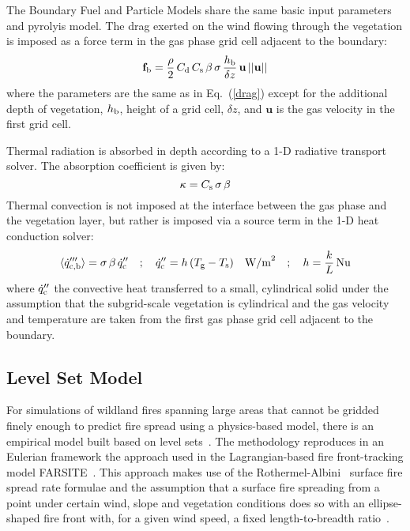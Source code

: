 \documentclass[journal,article,atmosphere,submit,moreauthors,pdftex]{Definitions/mdpi}
\begin{document}
The Boundary Fuel and Particle Models share the same basic input parameters and pyrolyis model. The drag exerted on the wind flowing through the vegetation is imposed as a force term in the gas phase grid cell adjacent to the boundary:
\begin{equation}
    \mathbf{f}_{\rm b} = \frac{\rho}{2} \, C_{\rm d} \, C_{\rm s} \, \beta \, \sigma \, \frac{h_{\rm b}}{\delta z} \, \mathbf{u} \, ||\mathbf{u}||
\end{equation}
where the parameters are the same as in Eq.~(\ref{drag}) except for the additional depth of vegetation, $h_{\rm b}$, height of a grid cell, $\delta z$, and $\mathbf{u}$ is the gas velocity in the first grid cell.

Thermal radiation is absorbed in depth according to a 1-D radiative transport solver. The absorption coefficient is given by:
\begin{equation}
   \kappa = C_{\rm s} \, \sigma \, \beta
\end{equation}
Thermal convection is not imposed at the interface between the gas phase and the vegetation layer, but rather is imposed via a source term in the 1-D heat conduction solver:
\begin{equation}
   \langle \dot{q}_{\rm c,b}''' \rangle = \sigma \, \beta \, \dot{q}_{\rm c}'' \quad ; \quad \dot{q}_{\rm c}'' = h \, (T_{\rm g} - T_{\rm s}) \quad \hbox{W/m}^2 \quad ; \quad  h = \frac{k}{L} \, {\rm Nu}
\end{equation}
where $\dot{q}_{\rm c}''$ the convective heat transferred to a small, cylindrical solid under the assumption that the subgrid-scale vegetation is cylindrical and the gas velocity and temperature are taken from the first gas phase grid cell adjacent to the boundary.


\subsection{Level Set Model}

For simulations of wildland fires spanning large areas that cannot be gridded finely enough to predict fire spread using a physics-based model, there is an empirical model built based on level sets~\cite{Bova:IJWF2015}. The methodology reproduces in an Eulerian framework the approach used in the Lagrangian-based fire front-tracking model FARSITE~\cite{Finney:FARSITE}. This approach makes use of the Rothermel-Albini~\cite{Rothermel:1972,Albini:1976} surface fire spread rate formulae and the assumption that a surface fire spreading from a point under certain wind, slope and vegetation conditions does so with an ellipse-shaped fire front with, for a given wind speed, a fixed length-to-breadth ratio~\cite{Richards:1990}.
\end{document}
